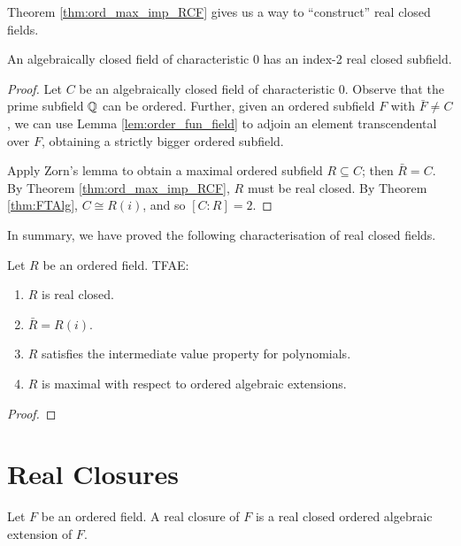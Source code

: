 Theorem \ref{thm:ord_max_imp_RCF} gives us a way to ``construct'' real closed fields.

\begin{lemma}
  \label{lem:ACF_ind_2_RCF}
  An algebraically closed field of characteristic 0 has an index-2 real closed subfield.
\end{lemma}
\begin{proof}
  Let $C$ be an algebraically closed field of characteristic 0. Observe that the prime subfield $\mathbb{Q}$ can be ordered. Further, given an ordered subfield $F$ with $\bar{F}\neq C$, we can use Lemma \ref{lem:order_fun_field} to adjoin an element transcendental over $F$, obtaining a strictly bigger ordered subfield.
  
  Apply Zorn's lemma to obtain a maximal ordered subfield $R\subseteq C$; then $\bar{R}=C$. By Theorem \ref{thm:ord_max_imp_RCF}, $R$ must be real closed. By Theorem \ref{thm:FTAlg}, $C\cong R(i)$, and so $[C:R]=2$.
\end{proof}

In summary, we have proved the following characterisation of real closed fields.

\begin{theorem}
  \label{thm:RCF_tfae}
  Let $R$ be an ordered field. TFAE:
  \begin{enumerate}
    \item $R$ is real closed.
    \item $\bar{R}=R(i)$.
    \item $R$ satisfies the intermediate value property for polynomials.
    \item $R$ is maximal with respect to ordered algebraic extensions.
  \end{enumerate}
\end{theorem}
\begin{proof}
\end{proof}

\section{Real Closures}

\begin{definition}
  \label{def:real_closure}
  Let $F$ be an ordered field. A real closure of $F$ is a real closed ordered algebraic extension of $F$.
\end{definition}

